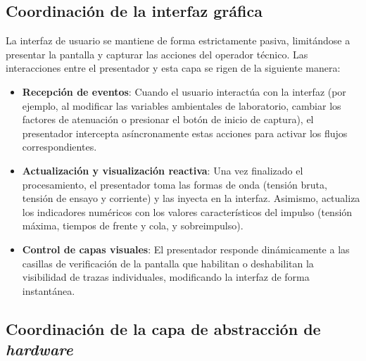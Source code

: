 \subsection{Coordinación de la interfaz gráfica}
\label{subsec:coordinacion_gui}

La interfaz de usuario se mantiene de forma estrictamente pasiva, limitándose a presentar la pantalla y capturar las acciones del operador técnico. Las interacciones entre el presentador y esta capa se rigen de la siguiente manera:
\begin{itemize}
    \item \textbf{Recepción de eventos}: Cuando el usuario interactúa con la interfaz (por ejemplo, al modificar las variables ambientales de laboratorio, cambiar los factores de atenuación o presionar el botón de inicio de captura), el presentador intercepta asíncronamente estas acciones para activar los flujos correspondientes.
    \item \textbf{Actualización y visualización reactiva}: Una vez finalizado el procesamiento, el presentador toma las formas de onda (tensión bruta, tensión de ensayo y corriente) y las inyecta en la interfaz. Asimismo, actualiza los indicadores numéricos con los valores característicos del impulso (tensión máxima, tiempos de frente y cola, y sobreimpulso).
    \item \textbf{Control de capas visuales}: El presentador responde dinámicamente a las casillas de verificación de la pantalla que habilitan o deshabilitan la visibilidad de trazas individuales, modificando la interfaz de forma instantánea.
\end{itemize}

\subsection{Coordinación de la capa de abstracción de \emph{hardware}}
\label{subsec:coordinacion_hardware}

